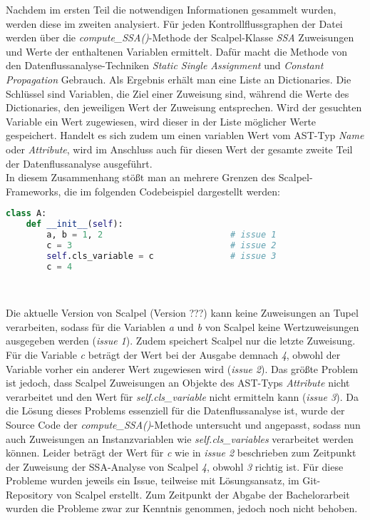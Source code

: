 \documentclass[german,bachelor]{swsLeipzig}
\begin{document}
Nachdem im ersten Teil die notwendigen Informationen gesammelt wurden, werden diese im zweiten analysiert.
Für jeden Kontrollflussgraphen der Datei werden über die \textit{compute\_SSA()}-Methode der Scalpel-Klasse \textit{SSA} Zuweisungen
und Werte der enthaltenen Variablen ermittelt.
Dafür macht die Methode von den Datenflussanalyse-Techniken \textit{Static Single Assignment} und \textit{Constant Propagation}
Gebrauch.
Als Ergebnis erhält man eine Liste an Dictionaries.
Die Schlüssel sind Variablen, die Ziel einer Zuweisung sind, während die Werte des Dictionaries, den jeweiligen Wert der Zuweisung
entsprechen.
Wird der gesuchten Variable ein Wert zugewiesen, wird dieser in der Liste möglicher Werte gespeichert.
Handelt es sich zudem um einen variablen Wert vom AST-Typ \textit{Name} oder \textit{Attribute}, wird im Anschluss auch für diesen Wert
der gesamte zweite Teil der Datenflussanalyse ausgeführt.\\

In diesem Zusammenhang stößt man an mehrere Grenzen des Scalpel-Frameworks, die im folgenden Codebeispiel dargestellt werden:\\

\noindent\begin{minipage}{\linewidth}
\begin{lstlisting}[language=Python, frame=single, basicstyle=\small, label=scalpel_limits, caption={Limitierungen der Datenflussanalyse},captionpos=b]
class A:
    def __init__(self):
        a, b = 1, 2                         # issue 1
        c = 3                               # issue 2
        self.cls_variable = c               # issue 3
        c = 4
\end{lstlisting}
\end{minipage}
\

Die aktuelle Version von Scalpel (Version ???) kann keine Zuweisungen an Tupel verarbeiten, sodass für die Variablen \textit{a} und \textit{b}
von Scalpel keine Wertzuweisungen ausgegeben werden (\textit{issue 1}).
Zudem speichert Scalpel nur die letzte Zuweisung.
Für die Variable \textit{c} beträgt der Wert bei der Ausgabe demnach \textit{4}, obwohl der Variable vorher ein anderer
Wert zugewiesen wird (\textit{issue 2}).
Das größte Problem ist jedoch, dass Scalpel Zuweisungen an Objekte des AST-Typs \textit{Attribute} nicht verarbeitet
und den Wert für \textit{self.cls\_variable} nicht ermitteln kann (\textit{issue 3}).
Da die Lösung dieses Problems essenziell für die Datenflussanalyse ist, wurde der Source Code der \textit{compute\_SSA()}-Methode
untersucht und angepasst, sodass nun auch Zuweisungen an Instanzvariablen wie \textit{self.cls\_variables} verarbeitet werden können.
Leider beträgt der Wert für \textit{c} wie in \textit{issue 2} beschrieben zum Zeitpunkt der Zuweisung der SSA-Analyse von Scalpel \textit{4}, obwohl
\textit{3} richtig ist.
Für diese Probleme wurden jeweils ein Issue, teilweise mit Lösungsansatz, im Git-Repository von Scalpel erstellt.
Zum Zeitpunkt der Abgabe der Bachelorarbeit wurden die Probleme zwar zur Kenntnis genommen, jedoch noch nicht behoben.\\
\end{document}
